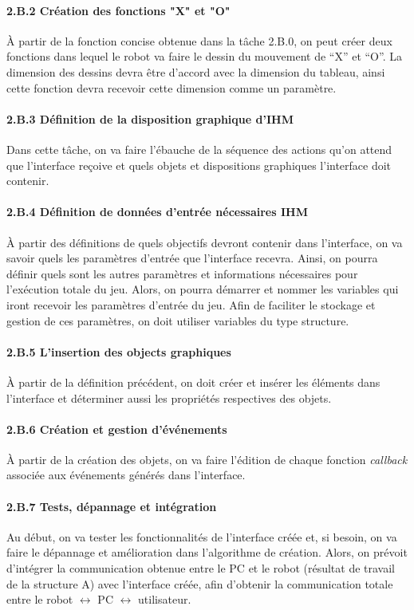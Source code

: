 \paragraph{2.B.2 Création des fonctions "X" et "O"}
À partir de la fonction concise obtenue dans la tâche 2.B.0, on peut créer deux fonctions dans lequel le robot va faire le dessin du mouvement de “X” et “O”. La dimension des dessins devra être d’accord avec la dimension du tableau, ainsi cette fonction devra recevoir cette dimension comme un paramètre.

\paragraph{2.B.3 Définition de la disposition graphique d’IHM}
Dans cette tâche, on va faire l’ébauche de la séquence des actions qu’on attend que l’interface reçoive et quels objets et dispositions graphiques l’interface doit contenir. 

\paragraph{2.B.4 Définition de données d'entrée nécessaires IHM}
À partir des définitions de quels objectifs devront contenir dans l’interface, on va savoir quels les paramètres d’entrée que l’interface recevra. Ainsi, on pourra définir quels sont les autres paramètres et informations nécessaires pour l'exécution totale du jeu.
Alors, on pourra démarrer et nommer les variables qui iront recevoir les paramètres d’entrée du jeu. Afin de faciliter le stockage et gestion de ces paramètres, on doit utiliser variables du type structure.

\paragraph{2.B.5 L'insertion des objects graphiques}
À partir de la définition précédent, on doit créer et insérer les éléments dans l’interface et déterminer aussi les propriétés respectives des objets.  

\paragraph{2.B.6 Création et gestion d'événements}
À partir de la création des objets, on va faire l’édition de chaque fonction \textit{callback} associée aux événements générés dans l’interface.  

\paragraph{2.B.7 Tests, dépannage et intégration}
Au début, on va tester les fonctionnalités de l’interface créée et, si besoin, on va faire le dépannage et amélioration dans l’algorithme de création.
Alors, on prévoit d'intégrer la communication obtenue entre le PC et le robot (résultat de travail de la structure A) avec l’interface créée, afin d’obtenir la communication totale entre le robot $ \leftrightarrow $ PC $ \leftrightarrow $ utilisateur.
